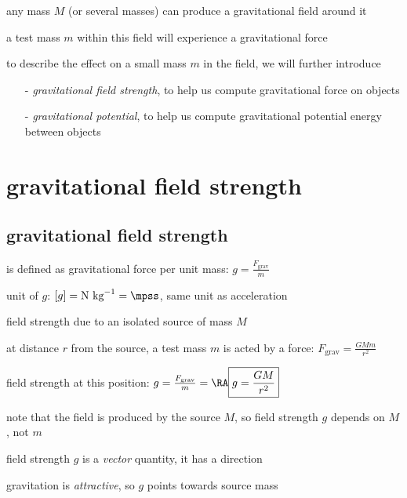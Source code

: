any mass $M$ (or several masses) can produce a gravitational field around it

a test mass $m$ within this field will experience a gravitational force

\vspace*{\baselineskip}

to describe the effect on a small mass $m$ in the field, we will further introduce
\begin{itemize}
	\item[-] \emph{gravitational field strength}, to help us compute gravitational force on objects
	
	\item[-] \emph{gravitational potential}, to help us compute gravitational potential energy between objects
\end{itemize}


\section{gravitational field strength}

\subsection{gravitational field strength}

\rcyskip

\begin{ilight}
	 is defined as gravitational force per unit mass: $\boxed{g=\frac{F_\text{grav}}{m}}$
\end{ilight}

\cmt unit of $g$: $[g]=\text{N kg}^{-1} = \mpss$, same unit as acceleration

\cmt field strength due to an isolated source of mass $M$

at distance $r$ from the source, a test mass $m$ is acted by a force: $F_\text{grav} = \frac{GMm}{r^2}$

field strength at this position: $g = \frac{F_\text{grav}}{m} = \RA \boxed{g=\frac{GM}{r^2}}$

note that the field is produced by the source $M$, so field strength $g$ depends on $M$, not $m$

\cmt field strength $g$ is a \emph{vector} quantity, it has a direction

gravitation is \emph{attractive}, so $g$ points towards source mass

